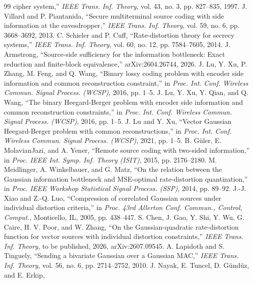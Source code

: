 ﻿\documentclass[11pt,onecolumn]{IEEEtran}
\begin{document}
\begin{thebibliography}{99}
cipher system,'' \emph{IEEE Trans. Inf. Theory}, vol. 43, no. 3, pp. 827--835,
1997.
 J. Villard and P. Piantanida, ``Secure multiterminal
source coding with side information at the eavesdropper,'' \emph{IEEE Trans.
Inf. Theory}, vol. 59, no. 6, pp. 3668--3692, 2013.
 C. Schieler and P. Cuff, ``Rate-distortion theory for
secrecy systems,'' \emph{IEEE Trans. Inf. Theory}, vol. 60, no. 12,
pp. 7584--7605, 2014.
 J. Armstrong, ``Source-side sufficiency for the
information bottleneck: Exact reduction and finite-block equivalence,''
arXiv:2604.26744, 2026.
 J. Lu, Y. Xu, P. Zhang, M. Feng, and Q. Wang, ``Binary
lossy coding problem with encoder side information and common reconstruction
constraint,'' in \emph{Proc. Int. Conf. Wireless Commun. Signal Process.
(WCSP)}, 2016, pp. 1--5.
 J. Lu, Y. Xu, Y. Qian, and Q. Wang, ``The binary
Heegard-Berger problem with encoder side information and common reconstruction
constraints,'' in \emph{Proc. Int. Conf. Wireless Commun. Signal Process.
(WCSP)}, 2016, pp. 1--5.
 J. Lu and Y. Xu, ``Vector Gaussian Heegard-Berger problem
with common reconstructions,'' in \emph{Proc. Int. Conf. Wireless Commun. Signal
Process. (WCSP)}, 2021, pp. 1--5.
 B. G\"uler, E. MolavianJazi, and A. Yener, ``Remote source
coding with two-sided information,'' in \emph{Proc. IEEE Int. Symp. Inf. Theory
(ISIT)}, 2015, pp. 2176--2180.
 M. Meidlinger, A. Winkelbauer, and G. Matz, ``On the
relation between the Gaussian information bottleneck and MSE-optimal
rate-distortion quantization,'' in \emph{Proc. IEEE Workshop Statistical Signal
Process. (SSP)}, 2014, pp. 89--92.
 J.-J. Xiao and Z.-Q. Luo, ``Compression of correlated
Gaussian sources under individual distortion criteria,'' in \emph{Proc. 43rd
Allerton Conf. Commun., Control, Comput.}, Monticello, IL, 2005,
pp. 438--447.
 S. Chen, J. Gao, Y. Shi, Y. Wu, G. Caire, H. V. Poor, and
W. Zhang, ``On the Gaussian-quadratic rate-distortion function for vector
sources with individual distortion constraints,'' \emph{IEEE Trans. Inf.
Theory}, to be published, 2026, arXiv:2607.09545.
 A. Lapidoth and S. Tinguely, ``Sending a
bivariate Gaussian over a Gaussian MAC,'' \emph{IEEE Trans. Inf. Theory},
vol. 56, no. 6, pp. 2714--2752, 2010.
 J. Nayak, E. Tuncel, D. G\"und\"uz, and E. Erkip,

\end{thebibliography}
\end{document}

